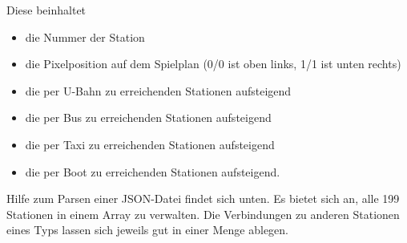        Diese beinhaltet
        \begin{itemize}
            \item die Nummer der Station
            \item die Pixelposition auf dem Spielplan (0/0 ist oben links, 1/1 ist unten rechts)
            \item die per U-Bahn zu erreichenden Stationen aufsteigend
            \item die per Bus zu erreichenden Stationen aufsteigend
            \item die per Taxi zu erreichenden Stationen aufsteigend
            \item die per Boot zu erreichenden Stationen aufsteigend.
        \end{itemize}
        Hilfe zum Parsen einer JSON-Datei findet sich unten.
        \newline
        \newline
        Es bietet sich an, alle 199 Stationen in einem Array zu verwalten.
        Die Verbindungen zu anderen Stationen eines Typs lassen sich jeweils gut in einer Menge ablegen.

